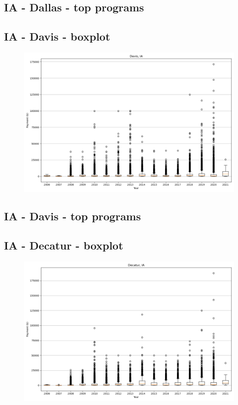 \subsection*{IA - Dallas - top programs}

\newpage
\subsection*{IA - Davis - boxplot}
\begin{figure}[h]
\centering
\includegraphics[width=7in]{../output/boxplots/counties/Davis-IA_boxplot.png}
\end{figure}


\subsection*{IA - Davis - top programs}

\newpage
\subsection*{IA - Decatur - boxplot}
\begin{figure}[h]
\centering
\includegraphics[width=7in]{../output/boxplots/counties/Decatur-IA_boxplot.png}
\end{figure}


